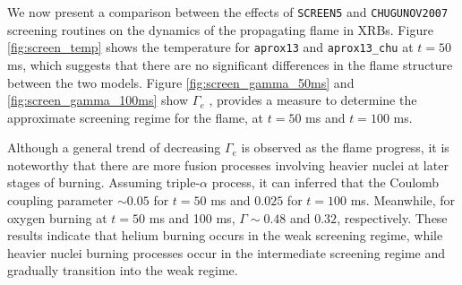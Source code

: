 \documentclass[preprint,times,tighten,linenumbers,trackchanges]{aastex631}
\begin{document}
\begin{figure*}
\centering
{}
\caption{\label{fig:screen_temp} Slice plots comparing temperature for {\tt aprox13} (top panel) and {\tt aprox13\_chu} (bottom panel) at $t = 50$ ms. }
\end{figure*}


\begin{figure*}
\centering
{}
\caption{\label{fig:screen_gamma_50ms} Slice plots comparing $\Gamma_e$ for {\tt aprox13} (top panel) and {\tt aprox13\_chu} (bottom panel) at $t = 50$ ms. }
\end{figure*}


\begin{figure*}
\centering
{}
\caption{\label{fig:screen_gamma_100ms} Slice plots comparing $\Gamma_e$ for {\tt aprox13} (top panel) and {\tt aprox13\_chu} (bottom panel) at $t = 100$ ms. }
\end{figure*}

We now present a comparison between the effects of {\tt SCREEN5} and {\tt CHUGUNOV2007} screening routines on the dynamics of the propagating flame in XRBs. Figure \ref{fig:screen_temp} shows the temperature for {\tt aprox13} and {\tt aprox13\_chu} at $t = 50$ ms, which suggests that there are no significant differences in the flame structure between the two models. Figure \ref{fig:screen_gamma_50ms} and \ref{fig:screen_gamma_100ms} show $\Gamma_e$ ,  provides a measure to determine the approximate screening regime for the flame, at $t = 50$ ms and $t = 100$ ms. 

Although a general trend of decreasing $\Gamma_e$ is observed as the flame progress, it is noteworthy that there are more fusion processes involving heavier nuclei at later stages of burning. Assuming triple-$\alpha$ process, it can inferred that the Coulomb coupling parameter  $\sim 0.05$ for $t = 50$ ms and $0.025$ for $t = 100$ ms. Meanwhile, for oxygen burning at $t = 50$ ms and 100 ms, $\Gamma \sim 0.48$ and $0.32$, respectively. These results indicate that helium burning occurs in the weak screening regime, while heavier nuclei burning processes occur in the intermediate screening regime and gradually transition into the weak regime.
\end{document}
